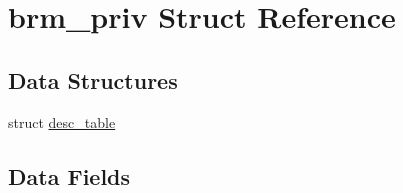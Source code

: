 \hypertarget{structbrm__priv}{}\section{brm\+\_\+priv Struct Reference}
\label{structbrm__priv}
\subsection*{Data Structures}
\begin{DoxyCompactItemize}
\item 
struct \mbox{\hyperlink{structbrm__priv_1_1desc__table}{desc\+\_\+table}}
\end{DoxyCompactItemize}
\subsection*{Data Fields}
